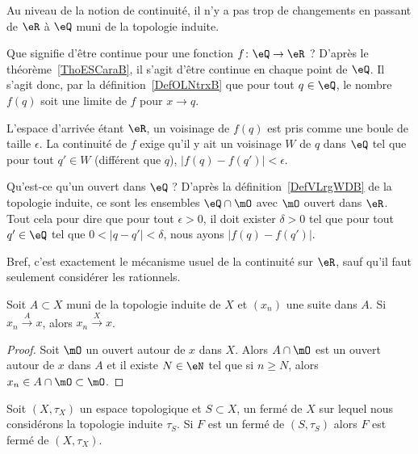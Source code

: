 Au niveau de la notion de continuité, il n'y a pas trop de changements en passant de \( \eR\) à \( \eQ\) muni de la topologie induite.

\begin{example}     \label{EXooHWIIooYYbfGE}
    Que signifie d'être continue pour une fonction \( f\colon \eQ\to \eR\) ? D'après le théorème~\ref{ThoESCaraB}, il s'agit d'être continue en chaque point de \( \eQ\). Il s'agit donc, par la définition~\ref{DefOLNtrxB} que pour tout \( q\in \eQ\), le nombre \( f(q)\) soit une limite de \( f\) pour \( x\to q\).

    L'espace d'arrivée étant \( \eR\), un voisinage de \( f(q)\) est pris comme une boule de taille \( \epsilon\). La continuité de \( f\) exige qu'il y ait un voisinage \( W\) de \( q\) dans \( \eQ\) tel que pour tout \( q'\in W\) (différent que \( q\)), \( | f(q)-f(q') |<\epsilon\).

    Qu'est-ce qu'un ouvert dans \( \eQ\) ? D'après la définition~\ref{DefVLrgWDB} de la topologie induite, ce sont les ensembles \( \eQ\cap\mO\) avec \( \mO\) ouvert dans \( \eR\). Tout cela pour dire que pour tout \( \epsilon>0\), il doit exister \( \delta>0\) tel que pour tout \( q'\in \eQ\) tel que \( 0<| q-q' |<\delta\), nous ayons \( | f(q)-f(q') |\).

    Bref, c'est exactement le mécanisme usuel de la continuité sur \( \eR\), sauf qu'il faut seulement considérer les rationnels.
\end{example}


\begin{lemma}   \label{LemPESaiVw}
    Soit \( A\subset X\) muni de la topologie induite de \( X\) et \( (x_n)\) une suite dans \( A\). Si \( x_n\stackrel{A}{\longrightarrow}x\), alors \( x_n\stackrel{X}{\longrightarrow}x\).
\end{lemma}

\begin{proof}
    Soit \( \mO\) un ouvert autour de \( x\) dans \( X\). Alors \( A\cap\mO\) est un ouvert autour de \( x\) dans \( A\) et il existe \( N\in \eN\) tel que si \( n\geq N\), alors \( x_n\in A\cap\mO\subset\mO\).
\end{proof}

\begin{lemma}        \label{LemBWSUooCCGvax}
    Soit \( (X,\tau_X)\) un espace topologique et \( S\subset X\), un fermé de \( X\) sur lequel nous considérons la topologie induite \( \tau_S\). Si \( F\) est un fermé de \( (S,\tau_S)\) alors \( F\) est fermé de \( (X,\tau_X)\).
\end{lemma}

